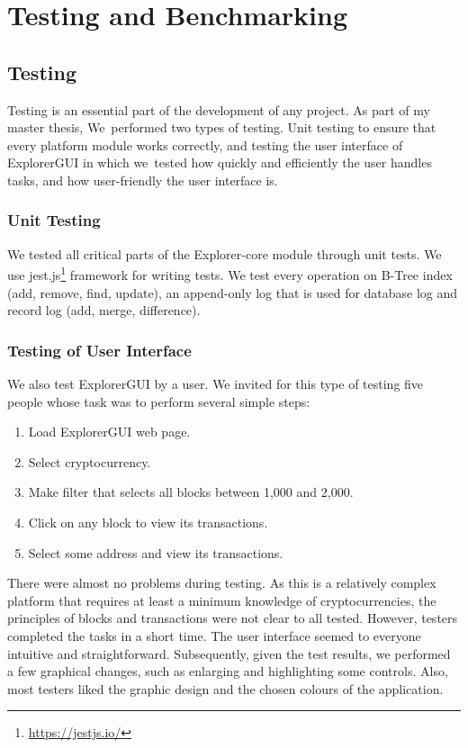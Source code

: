 \chapter{Testing and Benchmarking}

\section{Testing}
Testing is an essential part of the development of any project. As part of my master thesis, We~performed two types of testing. Unit testing to ensure that every platform module works correctly, and testing the user interface of ExplorerGUI in which we~tested how quickly and efficiently the user handles tasks, and how user-friendly the user interface is.

\subsection{Unit Testing}
We tested all critical parts of the Explorer-core module through unit tests. We use jest.js\footnote{\url{https://jestjs.io/}} framework for writing tests. We test every operation on B-Tree index (add, remove, find, update), an append-only log that is used for database log and record log (add, merge, difference).


\subsection{Testing of User Interface}
We also test ExplorerGUI by a user. We invited for this type of testing five people whose task was to perform several simple steps:
\begin{enumerate}
    \item Load ExplorerGUI web page.
    \item Select cryptocurrency.
    \item Make filter that selects all blocks between 1,000 and 2,000.
    \item Click on any block to view its transactions.
    \item Select some address and view its transactions.
\end{enumerate}
There were almost no problems during testing. As this is a relatively complex platform that requires at least a minimum knowledge of cryptocurrencies, the principles of blocks and transactions were not clear to all tested. However, testers completed the tasks in a short time. The user interface seemed to everyone intuitive and straightforward. Subsequently, given the test results, we performed a few graphical changes, such as enlarging and highlighting some controls. Also, most testers liked the graphic design and the chosen colours of the application.




